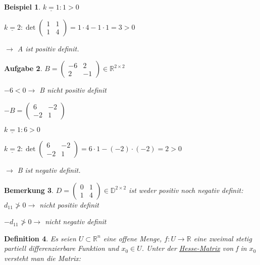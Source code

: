 \documentclass[fontset=ubuntu,11pt,a4paper,fleqn,headsepline]{scrreprt}
\newtheorem{defi}{Definition}[section]
\newtheorem{bemerkung}[defi]{Bemerkung}
\newtheorem{beispiel}[defi]{Beispiel}
\newtheorem{aufg}[defi]{Aufgabe}
\begin{document}
\begin{multicols}{2}
\begin{beispiel}
        \(\underline{k=1}:1>0\)
        
        \(\underline{k=2}: \det\begin{pmatrix}
        1 & 1 \\ 1 & 4
        \end{pmatrix} = 1\cdot4-1\cdot1=3>0\)
        
        \(\to\) A ist positiv definit.
    \end{beispiel}
    
    \begin{aufg}
        \(B=\begin{pmatrix}
        -6 & 2 \\ 2 & -1
        \end{pmatrix} \in \mathbb{R}^{2\times 2}\)
        
        \(-6<0 \to\) B nicht positiv definit
        
        \(-B=\begin{pmatrix}
        6 & -2 \\ -2 & 1
        \end{pmatrix}\)
        
        \(\underline{k=1}:6>0\)
        
        \(\underline{k=2}: \det\begin{pmatrix}
        6 & -2 \\ -2 & 1
        \end{pmatrix} = 6\cdot1 - (-2)\cdot(-2)=2>0\)
        
        \(\to\) B ist negativ definit.
    \end{aufg}
    
    \begin{bemerkung}
        \(D=\begin{pmatrix}
        0 & 1 \\ 1 & 4
        \end{pmatrix} \in \mathbb{D}^{2\times2}\) ist weder positiv noch negativ definit: \(d_{11}\not>0\to\) nicht positiv definit
        
        \(-d_{11}\not>0\to\) nicht negativ definit
    \end{bemerkung}
    
    \begin{defi}
        Es seien \(U\subset\mathbb{R}^n\) eine offene Menge, \(f:U\to\mathbb{R}\) eine zweimal stetig partiell differenzierbare Funktion und \(x_0\in U\). Unter der \underline{Hesse-Matrix} von f in \(x_0\) versteht man die Matrix: 
        

\end{defi}
\end{multicols}
\end{document}
